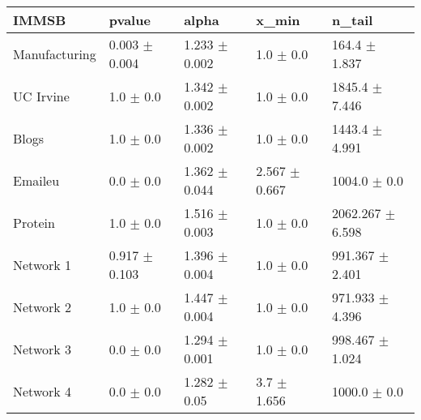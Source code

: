 \begin{tabular}{@{}lllll@{}}
\toprule

\textbf{IMMSB} & pvalue & alpha & x\_min & n\_tail \\\midrule

Manufacturing & 0.003 \(\pm\) 0.004 & 1.233 \(\pm\) 0.002 & 1.0 \(\pm\) 0.0 & 164.4 \(\pm\) 1.837 \\
UC Irvine & 1.0 \(\pm\) 0.0 & 1.342 \(\pm\) 0.002 & 1.0 \(\pm\) 0.0 & 1845.4 \(\pm\) 7.446 \\
Blogs & 1.0 \(\pm\) 0.0 & 1.336 \(\pm\) 0.002 & 1.0 \(\pm\) 0.0 & 1443.4 \(\pm\) 4.991 \\
Emaileu & 0.0 \(\pm\) 0.0 & 1.362 \(\pm\) 0.044 & 2.567 \(\pm\) 0.667 & 1004.0 \(\pm\) 0.0 \\
Protein & 1.0 \(\pm\) 0.0 & 1.516 \(\pm\) 0.003 & 1.0 \(\pm\) 0.0 & 2062.267 \(\pm\) 6.598 \\
Network 1 & 0.917 \(\pm\) 0.103 & 1.396 \(\pm\) 0.004 & 1.0 \(\pm\) 0.0 & 991.367 \(\pm\) 2.401 \\
Network 2 & 1.0 \(\pm\) 0.0 & 1.447 \(\pm\) 0.004 & 1.0 \(\pm\) 0.0 & 971.933 \(\pm\) 4.396 \\
Network 3 & 0.0 \(\pm\) 0.0 & 1.294 \(\pm\) 0.001 & 1.0 \(\pm\) 0.0 & 998.467 \(\pm\) 1.024 \\
Network 4 & 0.0 \(\pm\) 0.0 & 1.282 \(\pm\) 0.05 & 3.7 \(\pm\) 1.656 & 1000.0 \(\pm\) 0.0 \\

\bottomrule
\end{tabular}
